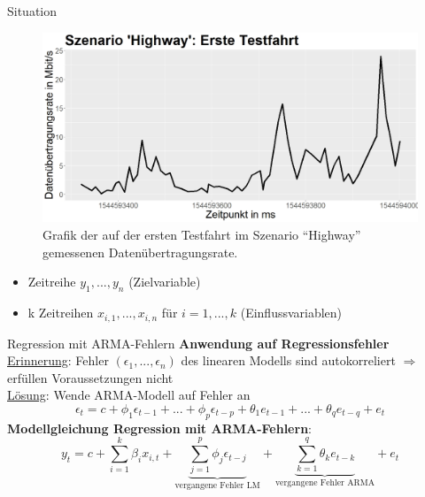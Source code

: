 \begin{frame}{Situation}
	\begin{figure}[]
		\includegraphics[scale=0.25]{highway_drive_one}
		\caption{Grafik der auf der ersten Testfahrt im Szenario ``Highway'' gemessenen Datenübertragungsrate.}
		\label{highway_drive_one}
	\end{figure}
	
	\begin{itemize}
		\item Zeitreihe $y_1,...,y_n$ (Zielvariable)
		\item k Zeitreihen $x_{i,1},...,x_{i,n}$ für $i=1,...,k$ (Einflussvariablen)
	\end{itemize}
\end{frame}
\begin{frame}{Regression mit ARMA-Fehlern}
	\textbf{Anwendung auf Regressionsfehler} \\
	\underline{Erinnerung}: Fehler $(\epsilon_1,...,\epsilon_n)$ des linearen Modells sind autokorreliert $\Rightarrow$ erfüllen Voraussetzungen nicht\\
	\underline{Lösung}: Wende ARMA-Modell auf Fehler an
	$$\epsilon_{t} = c + \phi_1 \epsilon_{t-1} + ... + \phi_p \epsilon_{t-p} + \theta_1 e_{t-1} + ... + \theta_q e_{t-q} + e_t$$
	\textbf{Modellgleichung Regression mit ARMA-Fehlern}:
	$$y_t = c + \sum_{i=1}^{k}{\beta_i x_{i,t}} + \underbrace{\sum_{j=1}^{p}{\phi_j\epsilon_{t-j}}}_{\text{vergangene Fehler LM}} + \underbrace{\sum_{k=1}^{q}{\theta_k e_{t-k}}}_{\text{vergangene Fehler ARMA}} + e_t$$
	
\end{frame}
